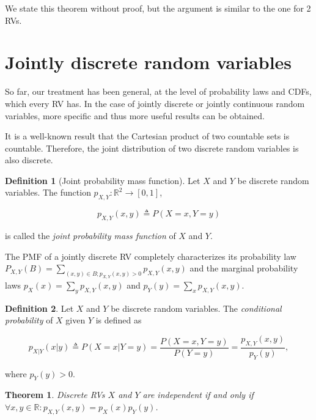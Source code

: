 \documentclass{book}
\theoremstyle{plain}%
\newtheorem{theorem}{Theorem}[section]
\theoremstyle{definition}
\newtheorem{definition}{Definition}[section]
\newlength{\arrow}
\begin{document}
We state this theorem without proof, but the argument is similar to the one for 2 RVs.

\section{Jointly discrete random variables}

So far, our treatment has been general, at the level of probability laws and CDFs, which every RV has. In the case of jointly discrete or jointly continuous random variables, more specific and thus more useful results can be obtained.

It is a well-known result that the Cartesian product of two countable sets is countable. Therefore, the joint distribution of two discrete random variables is also discrete.

\begin{definition}[Joint probability mass function]
Let $X$ and $Y$ be discrete random variables. The function $p_{X,Y}: \mathbb{R}^2 \rightarrow [0,1]$,

$$p_{X,Y}(x,y) \triangleq P(X = x, Y = y)$$

is called the \emph{joint probability mass function} of $X$ and $Y$.
\end{definition}

The PMF of a jointly discrete RV completely characterizes its probability law $P_{X,Y}(B) = \sum_{(x,y) \in B; p_{X,Y}(x,y) > 0} p_{X,Y}(x,y)$ and the marginal probability laws $p_X(x) = \sum_y  p_{X,Y}(x,y)$ and $p_Y(y) = \sum_x p_{X,Y}(x,y)$.

\begin{definition}
Let $X$ and $Y$ be discrete random variables. The \emph{conditional probability} of $X$ given $Y$ is defined as

$$p_{X|Y}(x|y) \triangleq P(X = x|Y = y) = \frac{P(X=x, Y=y)}{P(Y=y)} = \frac{p_{X,Y}(x, y)}{p_Y(y)},$$

where $p_Y(y) > 0$.
\end{definition}

\begin{theorem}
Discrete RVs $X$ and $Y$ are independent if and only if $\forall x,y \in \mathbb{R}: p_{X,Y}(x,y) = p_X(x)p_Y(y)$.
\end{theorem}
\end{document}
